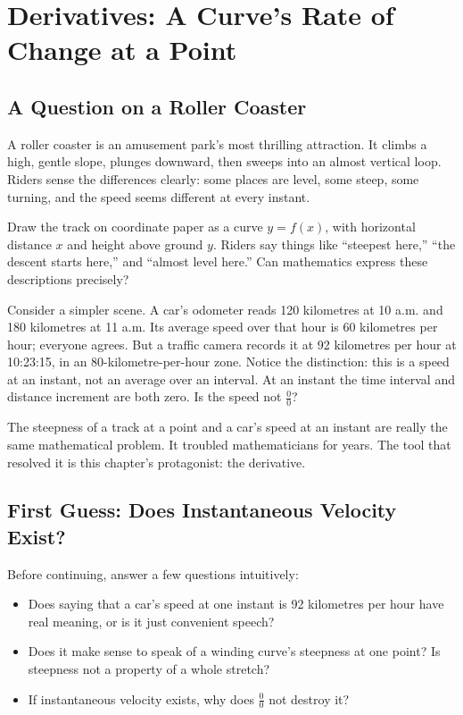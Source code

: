 \chapter{Derivatives: A Curve's Rate of Change at a Point}

\section{A Question on a Roller Coaster}

A roller coaster is an amusement park's most thrilling attraction. It climbs a high, gentle slope, plunges downward, then sweeps into an almost vertical loop. Riders sense the differences clearly: some places are level, some steep, some turning, and the speed seems different at every instant.

Draw the track on coordinate paper as a curve $y=f(x)$, with horizontal distance $x$ and height above ground $y$. Riders say things like ``steepest here,'' ``the descent starts here,'' and ``almost level here.'' Can mathematics express these descriptions precisely?

Consider a simpler scene. A car's odometer reads 120 kilometres at 10 a.m. and 180 kilometres at 11 a.m. Its average speed over that hour is 60 kilometres per hour; everyone agrees. But a traffic camera records it at 92 kilometres per hour at 10:23:15, in an 80-kilometre-per-hour zone. Notice the distinction: this is a speed at an instant, not an average over an interval. At an instant the time interval and distance increment are both zero. Is the speed not $\frac{0}{0}$?

The steepness of a track at a point and a car's speed at an instant are really the same mathematical problem. It troubled mathematicians for years. The tool that resolved it is this chapter's protagonist: the derivative.

\section{First Guess: Does Instantaneous Velocity Exist?}

Before continuing, answer a few questions intuitively:

\begin{itemize}
  \item Does saying that a car's speed at one instant is 92 kilometres per hour have real meaning, or is it just convenient speech?
  \item Does it make sense to speak of a winding curve's steepness at one point? Is steepness not a property of a whole stretch?
  \item If instantaneous velocity exists, why does $\frac{0}{0}$ not destroy it?
\end{itemize}

